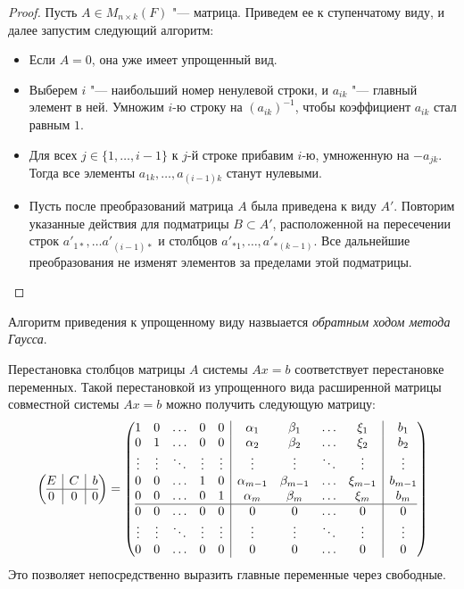 \begin{proof}
	Пусть $A \in M_{n \times k}(F)$ "--- матрица. Приведем ее к ступенчатому виду, и далее запустим следующий алгоритм:
	\begin{itemize}
		\item Если $A = 0$, она уже имеет упрощенный вид.
		\item Выберем $i$ "--- наибольший номер ненулевой строки, и $a_{ik}$ "--- главный элемент в ней. Умножим $i$-ю строку на $(a_{ik})^{-1}$, чтобы коэффициент $a_{ik}$ стал равным $1$.
		\item Для всех $j \in \{1, \dots, i - 1\}$ к $j$-й строке прибавим $i$-ю, умноженную на $-a_{jk}$. Тогда все элементы $a_{1k}, \dots, a_{(i-1)k}$ станут нулевыми.
		\item Пусть после преобразований матрица $A$ была приведена к виду $A'$. Повторим указанные действия для подматрицы $B \subset A'$, расположенной на пересечении строк $a'_{1*}, \dots a'_{(i-1)*}$ и столбцов $a'_{*1}, \dots, a'_{*(k - 1)}$. Все дальнейшие преобразования не изменят элементов за пределами этой подматрицы.
	\end{itemize}
\end{proof}

\begin{definition}
	Алгоритм приведения к упрощенному виду назвыается \textit{обратным ходом метода Гаусса}.
\end{definition}

\begin{note}
	Перестановка столбцов матрицы $A$ системы $Ax = b$ соответствует перестановке переменных. Такой перестановкой из упрощенного вида расширенной матрицы совместной системы $Ax = b$ можно получить следующую матрицу:
	\[
	\left(\begin{array}{@{}c|c|c@{}}
	E & C & b\\
	\hline
	0 & 0 & 0
	\end{array}\right)
	=
	\left(\begin{array}{@{}ccccc|cccc|c@{}}
	1 & 0 & \dots & 0 & 0 & \alpha_1 & \beta_1 & \dots & \xi_1 & b_1\\
	0 & 1 & \dots & 0 & 0 & \alpha_2 & \beta_2 &\dots & \xi_2 & b_2\\
	\vdots & \vdots & \ddots & \vdots & \vdots & \vdots & \vdots & \ddots & \vdots & \vdots\\
	0 & 0 & \dots & 1 & 0 & \alpha_{m - 1} & \beta_{m - 1} & \dots & \xi_{m -1} & b_{m - 1}\\
	0 & 0 & \dots & 0 & 1 & \alpha_m & \beta_m &\dots & \xi_m & b_m\\
	\hline
	0 & 0 & \dots & 0 & 0 & 0 & 0 &\dots & 0 & 0\\
	\vdots & \vdots & \ddots & \vdots & \vdots & \vdots & \vdots & \ddots & \vdots & \vdots\\
	0 & 0 & \dots & 0 & 0 & 0 & 0 &\dots & 0 & 0
	\end{array}\right)
	\]
	Это позволяет непосредственно выразить главные переменные через свободные.
\end{note}

